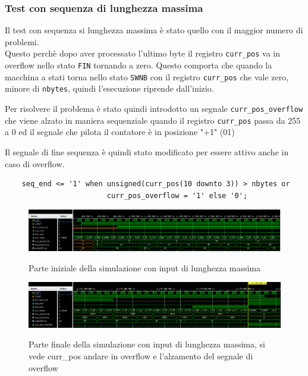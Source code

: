 \documentclass[12pt, a4paper]{article}
\begin{document}
\pagebreak

\subsubsection{Test con sequenza di lunghezza massima}

Il test con sequenza si lunghezza massima è stato quello con il maggior numero di problemi. \\
Questo perchè dopo aver processato l'ultimo byte il registro \texttt{curr\_pos} va in overflow
nello stato \texttt{FIN} tornando a zero.
\noindent Questo comporta che quando la macchina a stati torna nello stato \texttt{SWNB} con il registro \texttt{curr\_pos} 
che vale zero, minore di \texttt{nbytes}, quindi l'esecuzione riprende dall'inizio.

\noindent Per risolvere il problema è stato quindi introdotto un segnale \texttt{curr\_pos\_overflow} che viene alzato in maniera sequenziale
quando il registro \texttt{curr\_pos} passa da 255 a 0 ed il segnale che pilota il contatore è in posizione "+1" (01)

\noindent Il segnale di fine sequenza è quindi stato modificato per essere attivo anche in caso di
overflow.

\begin{verbatim}
    seq_end <= '1' when unsigned(curr_pos(10 downto 3)) > nbytes or 
                        curr_pos_overflow = '1' else '0';
\end{verbatim}

\begin{figure}[h!]
    \centering
    \includegraphics[scale=0.3]{sim_maxlen_init.png}
    \label{img:sim_max_init}
    \caption{Parte iniziale della simulazione con input di lunghezza massima}
\end{figure}

\begin{figure}[h!]
    \centering
    \includegraphics[scale=0.3]{sim_maxlen_end.png}
    \label{img:sim_max_end}
    \caption{Parte finale della simulazione con input di lunghezza massima, si vede curr\_pos andare in overflow e l'alzamento del segnale di overflow}
\end{figure}
\end{document}
